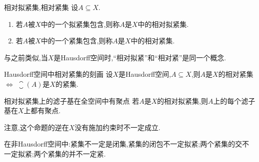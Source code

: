 \begin{definition}{相对拟紧集,相对紧集}{}
	设$A\subseteq X$.
	\begin{enumerate}
		\item 若$A$被$X$中的一个拟紧集包含,则称$A$是$X$中的相对拟紧集.
		\item 若$A$被$X$中的一个紧集包含,则称$A$是$X$中的相对紧集.
	\end{enumerate}
\end{definition}

\begin{remark}{}{}
	与之前类似,当$X$是Hausdorff空间时,``相对拟紧''和``相对紧''是同一个概念.
\end{remark}

\begin{proposition}{Hausdorff空间中相对紧集的刻画}{}
	设$X$是Hausdorff空间,$A\subseteq X$,则$A$是$X$的相对紧集$\iff$ $\closure\left(A\right)$是$X$的紧集.
\end{proposition}

\begin{proposition}{相对拟紧集上的滤子基在全空间中有聚点}{}
	若$A$是$X$的相对拟紧集,则$A$上的每个滤子基在$X$上都有聚点.
\end{proposition}

\begin{remark}{}{}
	注意,这个命题的逆在$X$没有施加约束时不一定成立.
\end{remark}

\begin{remark}{}{}
	在非Hausdorff空间中:紧集不一定是闭集,紧集的闭包不一定拟紧;两个紧集的交不一定拟紧;两个紧集的并不一定紧.
\end{remark}

